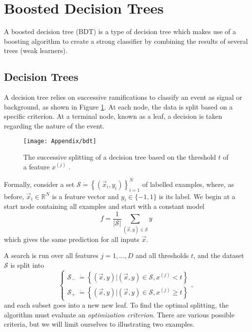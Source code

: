 \documentclass[10pt,a4paper]{book}
\begin{document}
\section{Boosted Decision Trees}
A boosted decision tree (BDT) is a type of decision tree which makes use of a boosting algorithm to create a strong classifier by combining the results of several trees (weak learners). 

\subsection{Decision Trees}
A decision tree relies on successive ramifications to classify an event as signal or background, as shown in Figure \ref{tree}. At each node, the data is split based on a specific criterion. At a terminal node, known as a leaf, a decision is taken regarding the nature of the event.

\begin{figure}
\centering
\texttt{[image: Appendix/bdt]}
\caption{The successive splitting of a decision tree based on the threshold $t$ of a feature $x^{(j)}$ \cite{tree_image}.}
\label{tree}
\end{figure}

Formally, consider a set $\mathcal{S} \dot{=} \left\lbrace (\vec{x}_i, y_i) \right\rbrace_{i = 1}^N$ of labelled examples, where, as before, $\vec{x}_i \in \mathbb{R}^N$ is a feature vector and $y_i \in \lbrace -1, 1 \rbrace$ is its label. We begin at a start node containing all examples and start with a constant model
\begin{equation}
f = \frac{1}{\vert \mathcal{S} \vert} \sum_{(\vec{x},y) \in \mathcal{S}} y
\end{equation}
which gives the same prediction for all inputs $\vec{x}$.

A search is run over all features $j = 1, \dots, D$ and all thresholds $t$, and the dataset $\mathcal{S}$ is split into
\begin{equation}
\begin{cases}
\mathcal{S}_{-} \; \dot{=} \left\lbrace (\vec{x},y) \vert (\vec{x},y) \in \mathcal{S}, x^{(j)} < t \right\rbrace \\
\mathcal{S}_{+} \; \dot{=} \left\lbrace (\vec{x},y) \vert (\vec{x},y) \in \mathcal{S}, x^{(j)} \geq t \right\rbrace
\end{cases},
\end{equation}
and each subset goes into a new new leaf. To find the optimal splitting, the algorithm must evaluate an \emph{optimization criterion}. There are various possible criteria, but we will limit ourselves to illustrating two examples.
\end{document}
